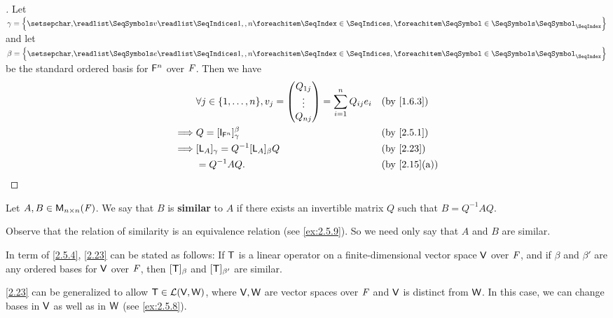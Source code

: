 \begin{proof}[]
  Let \(\gamma = \set{\seq{v}{1,,n}}\) and let \(\beta = \set{\seq{e}{1,,n}}\) be the standard ordered basis for \(\mathsf{F}^n\) over \(\mathit{F}\).
  Then we have
  \begin{align*}
             & \forall j \in \set{1, \dots, n}, v_j = \begin{pmatrix}
                                                        Q_{1 j} \\
                                                        \vdots  \\
                                                        Q_{n j}
                                                      \end{pmatrix} = \sum_{i = 1}^n Q_{i j} e_i &  & \text{(by \cref{1.6.3})} \\
    \implies & Q = [\IT_{\vs{F}^n}]_{\gamma}^{\beta}                  &  & \text{(by \cref{2.5.1})}                            \\
    \implies & [\L_A]_{\gamma} = Q^{-1} [\L_A]_{\beta} Q              &  & \text{(by \cref{2.23})}                             \\
             & = Q^{-1} A Q.                                          &  & \text{(by \cref{2.15}(a))}
  \end{align*}
\end{proof}

\begin{defn}\label{2.5.4}
  Let \(A, B \in \mathsf{M}_{{n} \times n}({\mathit{F}})\).
  We say that \(B\) is \textbf{similar} to \(A\) if there exists an invertible matrix \(Q\) such that \(B = Q^{-1} A Q\).
\end{defn}

\begin{note}
  Observe that the relation of similarity is an equivalence relation
  (see \cref{ex:2.5.9}).
  So we need only say that \(A\) and \(B\) are similar.
\end{note}

\begin{note}
  In term of \cref{2.5.4}, \cref{2.23} can be stated as follows:
  If \(\mathsf{T}\) is a linear operator on a finite-dimensional vector space \(\mathsf{V}\) over \(\mathit{F}\), and if \(\beta\) and \(\beta'\) are any ordered bases for \(\mathsf{V}\) over \(\mathit{F}\), then \([\mathsf{T}]_{\beta}\) and \([\mathsf{T}]_{\beta'}\) are similar.
\end{note}

\begin{note}
  \cref{2.23} can be generalized to allow \(\mathsf{T} \in \mathcal{L}(\mathsf{V}, \mathsf{W})\), where \(\mathsf{V}, \mathsf{W}\) are vector spaces over \(\mathit{F}\) and \(\mathsf{V}\) is distinct from \(\mathsf{W}\).
  In this case, we can change bases in \(\mathsf{V}\) as well as in \(\mathsf{W}\)
  (see \cref{ex:2.5.8}).
\end{note}

